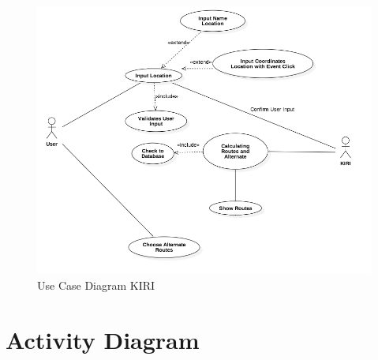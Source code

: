 \begin{figure}[H]
	\centering
	\includegraphics[scale=0.5]{Gambar/usecase}
	\caption{Use Case Diagram KIRI} 
	\label{fig:3_usecase}
\end{figure}

\section{Activity Diagram}
\label{sec:activitydiagram}

